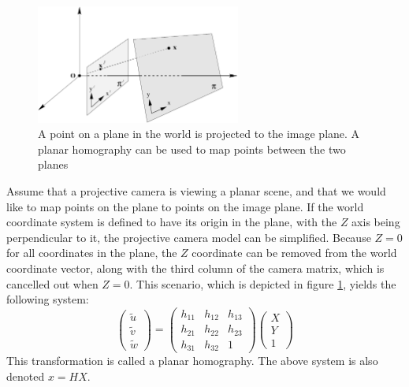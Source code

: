 \begin{figure}
\begin{center}
\includegraphics[width=0.6\textwidth]{figures/planar_homography.pdf}
\end{center}
\caption{A point on a plane in the world is projected to the image plane. A planar homography can be used to map points between the two planes} %
\label{fig:planar_homography}
\end{figure}

Assume that a projective camera is viewing a planar scene, and that we would like to map points on the plane to points on the image plane. 
If the world coordinate system is defined to have its origin in the plane, with the $Z$ axis being perpendicular to it, the projective camera model can be simplified. 
Because $Z=0$ for all coordinates in the plane, the $Z$ coordinate can be removed from the world coordinate vector, along with the third column of the camera matrix, which is cancelled out when $Z=0$. 
This scenario, which is depicted in figure \ref{fig:planar_homography}, yields the following system:
\begin{equation}\label{eq:homography}
\begin{pmatrix} \tilde{u} \\ \tilde{v} \\ \tilde{w} \end{pmatrix} =
\begin{pmatrix} h_{11} & h_{12} & h_{13}  \\
 				h_{21} & h_{22} & h_{23}  \\
				h_{31} & h_{32} & 1\end{pmatrix}
\begin{pmatrix}X \\Y \\ 1\end{pmatrix}
\end{equation}
This transformation is called a planar homography.
The above system is also denoted $x=HX$.

